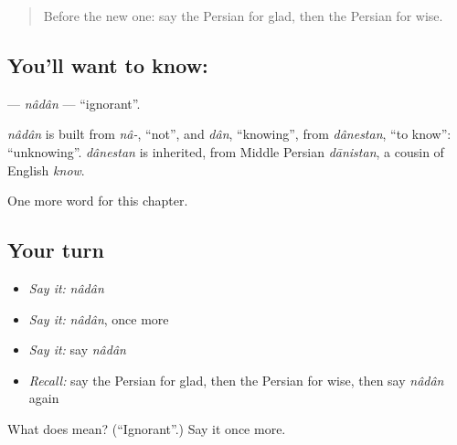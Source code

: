 \label{lesson:FA-C129-nadan}



\begin{quote}
Before the new one: say the Persian for glad, then the Persian for wise.
\end{quote}

\subsection*{You'll want to know: }
\textbf{} — \emph{nâdân} — \textquotedblleft{}ignorant\textquotedblright{}.

\begin{cousinweb}
\emph{nâdân} is built from \emph{nâ-}, \textquotedblleft{}not\textquotedblright{}, and \emph{dân}, \textquotedblleft{}knowing\textquotedblright{}, from \emph{dânestan}, \textquotedblleft{}to know\textquotedblright{}: \textquotedblleft{}unknowing\textquotedblright{}. \emph{dânestan} is inherited, from Middle Persian \emph{dānistan}, a cousin of English \emph{know}.
\end{cousinweb}

\begin{grammarlens}[title={What you've built}]
One more word for this chapter.
\end{grammarlens}

\subsection*{Your turn}
\begin{itemize}
\raggedright
  \item \emph{Say it:} \emph{nâdân}
  \item \emph{Say it:} \emph{nâdân}, once more
  \item \emph{Say it:} say \emph{nâdân}
  \item \emph{Recall:} say the Persian for glad, then the Persian for wise, then say \emph{nâdân} again
\end{itemize}

\begin{tcolorbox}[breakable,colback=teal!4,colframe=teal!35!black,title={Before you move on}]
What does  mean? (\textquotedblleft{}Ignorant\textquotedblright{}.) Say it once more.
\end{tcolorbox}
